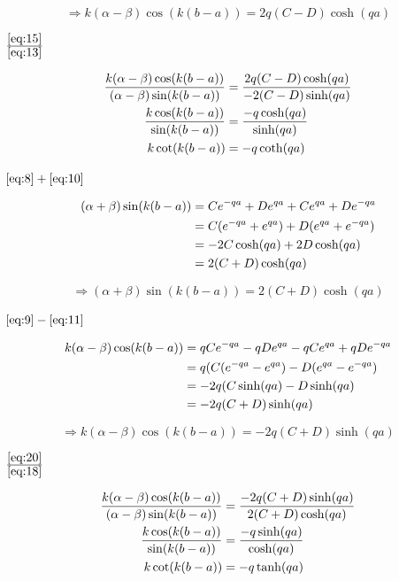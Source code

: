 \begin{equation}
  \label{eq:15}
 \Rightarrow  k(\alpha-\beta)\cos(k(b-a))=2q(C-D)\cosh(qa)
\end{equation}


\( \frac{\eqref{eq:15}}{ \eqref{eq:13} } \)

\begin{align} 
\frac{k(\alpha-\beta)\cos(k(b-a))}{(\alpha-\beta)\sin(k(b-a)) }&=  \frac{2q(C-D)\cosh(qa)}{-2(C-D)\sinh(qa) } \notag \\
\frac{k\cos(k(b-a))}{\sin(k(b-a)) }&=  \frac{-q\cosh(qa)}{\sinh(qa) } \notag \\
k\cot(k(b-a)) &= - q\coth(qa) \label{eq:16}
\end{align}


\( \eqref{eq:8}+\eqref{eq:10}  \)

\begin{align}
  \label{eq:17}
  (\alpha+\beta)\sin(k(b-a)) &= Ce^{-qa}+De^{qa}+ Ce^{qa}+De^{-qa}  \notag\\
&= C(e^{-qa}+ e^{qa})+D(e^{qa}+e^{-qa}) \notag \\
&=-2C\cosh(qa)+2D\cosh(qa) \notag \\
&=2(C+D)\cosh(qa)
\end{align}

\begin{equation}
  \label{eq:18}
 \Rightarrow  (\alpha+\beta)\sin(k(b-a))=2(C+D)\cosh(qa)
\end{equation}

\( \eqref{eq:9}-\eqref{eq:11}  \)

\begin{align}
  \label{eq:19}
  k(\alpha-\beta)\cos(k(b-a)) &= qCe^{-qa}-qDe^{qa}- qCe^{qa}+qDe^{-qa} \notag \\
&= q(C(e^{-qa}- e^{qa})-D(e^{qa}-e^{-qa})  \notag\\
&= -2q(C\sinh(qa)-D\sinh(qa)  \notag\\
&=-2q(C+D)\sinh(qa)
\end{align}

\begin{equation}
  \label{eq:20}
 \Rightarrow  k(\alpha-\beta)\cos(k(b-a))=-2q(C+D)\sinh(qa)
\end{equation}


\( \frac{\eqref{eq:20}}{ \eqref{eq:18} } \)

\begin{align}
\frac{k(\alpha-\beta)\cos(k(b-a))}{(\alpha-\beta)\sin(k(b-a)) }&=  \frac{-2q(C+D)\sinh(qa)}{2(C+D)\cosh(qa) }  \notag\\
\frac{k\cos(k(b-a))}{\sin(k(b-a)) }&= \frac{-q\sinh(qa)}{\cosh(qa) } \notag \\
k\cot(k(b-a)) &= -q \tanh(qa) \label{eq:21}
\end{align}


